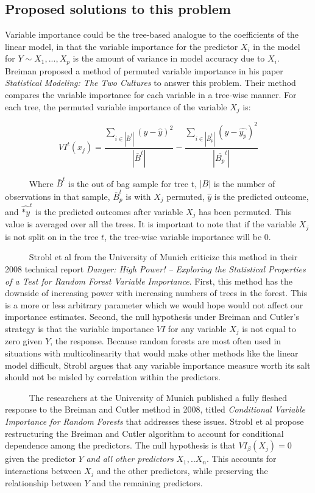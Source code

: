 \documentclass[12pt,twoside]{reedthesis}
\begin{document}
  \subsection{Proposed solutions to this
  problem}\label{proposed-solutions-to-this-problem}
  
  Variable importance could be the tree-based analogue to the coefficients
  of the linear model, in that the variable importance for the predictor
  \(X_i\) in the model for \(Y \sim X_1,...,X_p\) is the amount of
  variance in model accuracy due to \(X_i\). Breiman proposed a method of
  permuted variable importance in his paper \emph{Statistical Modeling:
  The Two Cultures} to answer this problem. Their method compares the
  variable importance for each variable in a tree-wise manner. For each
  tree, the permuted variable importance of the variable \(X_j\) is:
  
  \label{eq:eqpermvi}
  \[VI^t(x_j) = \frac{\sum_{i \in |\bar{B}^t|} ({y} - \hat{y})^2}{|\bar{B}^t|} - \frac{\sum_{i \in |\bar{B}^t_p|} ({y} - \hat{y_p})^2}{|\bar{B_p}^t|} \]
  
  ~~~~~ Where \(\bar{B}^t\) is the out of bag sample for tree t, \(|B|\)
  is the number of observations in that sample, \(\bar{B}_p^t\) is with
  \(X_j\) permuted, \(\hat{y}\) is the predicted outcome, and
  \(\hat{*y}^t\) is the predicted outcomes after variable \(X_j\) has been
  permuted. This value is averaged over all the trees. It is important to
  note that if the variable \(X_j\) is not split on in the tree \(t\), the
  tree-wise variable importance will be 0.
  
  ~~~~~ Strobl et al from the University of Munich criticize this method
  in their 2008 technical report \emph{Danger: High Power! -- Exploring
  the Statistical Properties of a Test for Random Forest Variable
  Importance}. First, this method has the downside of increasing power
  with increasing numbers of trees in the forest. This is a more or less
  arbitrary parameter which we would hope would not affect our importance
  estimates. Second, the null hypothesis under Breiman and Cutler's
  strategy is that the variable importance \(VI\) for any variable \(X_j\)
  is not equal to zero given \(Y\), the response. Because random forests
  are most often used in situations with multicolinearity that would make
  other methods like the linear model difficult, Strobl argues that any
  variable importance measure worth its salt should not be misled by
  correlation within the predictors.
  
  ~~~~~ The researchers at the University of Munich published a fully
  fleshed response to the Breiman and Cutler method in 2008, titled
  \emph{Conditional Variable Importance for Random Forests} that addresses
  these issues. Strobl et al propose restructuring the Breiman and Cutler
  algorithm to account for conditional dependence among the predictors.
  The null hypothesis is that \(VI_{\beta}(X_j) = 0\) given the predictor
  \(Y\) \emph{and all other predictors} \(X_1,..X_n\). This accounts for
  interactions between \(X_j\) and the other predictors, while preserving
  the relationship between \(Y\) and the remaining predictors.
  
\end{document}
